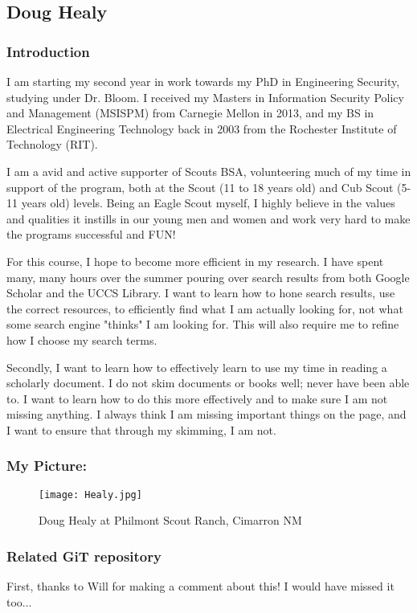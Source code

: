 \subsection{Doug Healy}
\subsubsection{Introduction}

I am starting my second year in work towards my PhD in Engineering Security, studying under Dr. Bloom. I received my Masters in Information Security Policy and Management (MSISPM) from Carnegie Mellon in 2013, and my BS in Electrical Engineering Technology back in 2003 from the Rochester Institute of Technology (RIT). 

I am a avid and active supporter of Scouts BSA, volunteering much of my time in support of the program, both at the Scout (11 to 18 years old) and Cub Scout (5-11 years old) levels. Being an Eagle Scout myself, I highly believe in the values and qualities it instills in our young men and women and work very hard to make the programs successful and FUN!  

For this course, I hope to become more efficient in my research. I have spent many, many hours over the summer pouring over search results from both Google Scholar and the UCCS Library. I want to learn how to hone search results, use the correct resources, to efficiently find what I am actually looking for, not what some search engine "thinks" I am looking for. This will also require me to refine how I choose my search terms.  

Secondly, I want to learn how to effectively learn to use my time in reading a scholarly document. I do not skim documents or books well; never have been able to. I want to learn how to do this more effectively and to make sure I am not missing anything. I always think I am missing important things on the page, and I want to ensure that through my skimming, I am not.   

\subsubsection{My Picture: }
\begin{figure}[htp]
    \centering
    \texttt{[image: Healy.jpg]}
    \caption{Doug Healy at Philmont Scout Ranch, Cimarron NM}
 \end{figure}
 
\subsubsection{Related GiT repository}
First, thanks to Will for making a comment about this! I would have missed it too...

